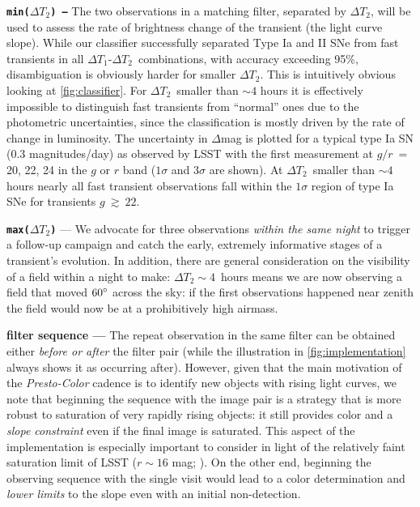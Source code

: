 \documentclass[letterpaper,longauthor,trackchanges,twocolumn,onecolappendix,sort&compress]{aastex62}
\newcommand{\red}[1]{\textcolor{red}{#1}}
\newcommand{\dtone}{\ensuremath{\Delta T_1}}
\newcommand{\dttwo}{\ensuremath{\Delta T_2}}
\begin{document}
\vspace{1.5mm}
{\tt {\bf min(\dttwo) ---}} The two observations in a matching filter, separated by \dttwo, will be used to assess the rate of brightness change of the transient (the light curve slope). While our classifier successfully separated Type Ia and II SNe from fast transients in all \dtone-\dttwo\ combinations, with accuracy exceeding 95\%, disambiguation is obviously harder for smaller \dttwo. This is intuitively obvious looking at \autoref{fig:classifier}. %
For \dttwo\ smaller than $\sim4$ hours it is effectively impossible to distinguish fast transients from ``normal'' ones due to the photometric uncertainties, since the classification is mostly driven by the rate of change in luminosity. The uncertainty in $\Delta$mag is plotted for a typical type Ia SN (0.3 magnitudes/day) as observed by LSST with the first measurement at $g/r~=~$20, 22, 24 in the $g$ or $r$ band ($1\sigma$ and $3\sigma$ are shown). At \dttwo\ smaller than $\sim4$ hours nearly all fast transient observations fall within the $1\sigma$ region of type Ia SNe for transients $g~\gtrsim~22$.

\vspace{1.5mm}
{\tt {\bf max(\dttwo)}} --- We advocate for three observations \emph{within the same night} to trigger a follow-up campaign and catch the early, extremely informative stages of a transient’s evolution. In addition, there are general consideration on the visibility of a field within a night to make: $\dttwo\sim4$~hours means we are now observing a field that moved $60\mbox{$^\circ$}$ across the sky: if the first observations happened near zenith the field would now be at a prohibitively high airmass. 

\vspace{1.5mm}
{\bf filter sequence ---} The repeat observation in the same filter can be obtained either \emph{before or after} the filter pair (while the illustration in \autoref{fig:implementation} always shows it as occurring after). However, given that the main motivation of the {\em Presto-Color} cadence is to identify new objects with rising light curves, we note that beginning the sequence with the image pair is a strategy that is more robust to saturation of very rapidly rising objects: it still provides color and a \emph{slope constraint} even if the final image is saturated. This aspect of the implementation is especially important to consider in light of the relatively faint saturation limit of LSST ($r\sim16$ mag; \citealt{lsst}).
On the other end, beginning the observing sequence with the single visit would lead to a color determination and \emph{lower limits}  to the slope even with an initial non-detection.
\end{document}
